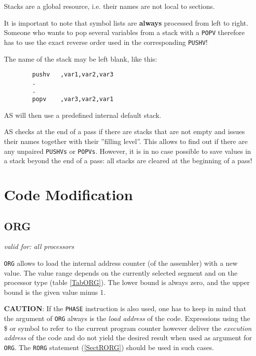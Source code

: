 \documentclass[12pt,twoside]{report}
\makeatletter
\newcommand{\bb}[1]{{\bf #1}}
\newcommand{\tty}[1]{{\tt #1}}
\newcommand{\ttindex}[1]{\index{#1@{\tt #1}}}
\newcommand{\asname}{{AS}}
\makeatother
\begin{document}
Stacks are a global resource, i.e. their names are not local to
sections.

It is important to note that symbol lists are \bb{always} processed from
left to right.  Someone who wants to pop several variables from a stack
with a \tty{POPV} therefore has to use the exact reverse order used in the
corresponding \tty{PUSHV}!

The name of the stack may be left blank, like this:
\begin{verbatim}
        pushv   ,var1,var2,var3
        .
        .
        popv    ,var3,var2,var1
\end{verbatim}
\asname{} will then use a predefined internal default stack.

\asname{} checks at the end of a pass if there are stacks that are not empty and
issues their names together with their ''filling level''.  This allows to
find out if there are any unpaired \tty{PUSHVs} or \tty{POPVs}.  However,
it is in no case possible to save values in a stack beyond the end of a
pass: all stacks are cleared at the beginning of a pass!


\section{Code Modification}


\subsection{ORG}
\label{SectORG}
\ttindex{ORG}

{\em valid for: all processors}

\tty{ORG} allows to load the internal address counter (of the assembler)
with a new value. The value range depends on the currently selected
segment and on the processor type (table \ref{TabORG}).
The lower bound is always zero, and the upper bound is the given value
minus 1.
\par
{\bf CAUTION}: If the \tty{PHASE} instruction is also used, one
has to keep in mind that the argument of \tty{ORG} always is the
{\em load address} of the code.  Expressions using the \$ or \*
symbol to refer to the current program counter however deliver
the {\em execution address} of the code and do not yield the
desired result when used as argument for \tty{ORG}.  The
\tty{RORG} statement (\ref{SectRORG}) should be used in such cases.
\end{document}

